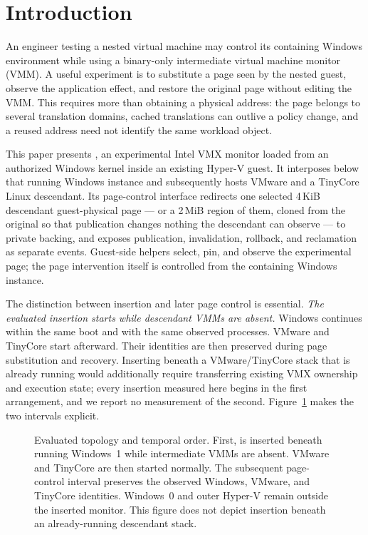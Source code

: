 \section{Introduction}
An engineer testing a nested virtual machine may control its containing Windows
environment while using a binary-only intermediate virtual machine monitor
(VMM). A useful experiment is to substitute a page seen by the nested guest,
observe the application effect, and restore the original page without editing
the VMM. This requires more than obtaining a physical address: the page belongs
to several translation domains, cached translations can outlive a policy
change, and a reused address need not identify the same workload object.

This paper presents \ks{}, an experimental Intel VMX monitor loaded from an
authorized Windows kernel inside an existing Hyper-V guest. It interposes below
that running Windows instance and subsequently hosts VMware and a TinyCore Linux
descendant. Its page-control interface redirects one selected 4\,KiB descendant
guest-physical page --- or a 2\,MiB region of them, cloned from the original so
that publication changes nothing the descendant can observe --- to private
backing, and exposes publication, invalidation, rollback, and reclamation as
separate events. Guest-side helpers select, pin, and observe the experimental
page; the page intervention itself is controlled from the containing Windows
instance.

The distinction between insertion and later page control is essential.
\emph{The evaluated insertion starts while descendant VMMs are absent.}
Windows continues within the same boot and with the same observed processes.
VMware and TinyCore start afterward. Their identities are then preserved during
page substitution and recovery. Inserting beneath a VMware/TinyCore stack that
is already running would additionally require transferring existing VMX
ownership and execution state; every insertion measured here begins in the
first arrangement, and we report no measurement of the second.
Figure~\ref{fig:topology} makes the two intervals explicit.

\begin{figure}[tbp]
\centering

\caption{Evaluated topology and temporal order. First, \ks{} is inserted beneath
running Windows~1 while intermediate VMMs are absent. VMware and TinyCore are
then started normally. The subsequent page-control interval preserves the
observed Windows, VMware, and TinyCore identities. Windows~0 and outer Hyper-V
remain outside the inserted monitor. This figure does not depict insertion
beneath an already-running descendant stack.}
\label{fig:topology}
\end{figure}

